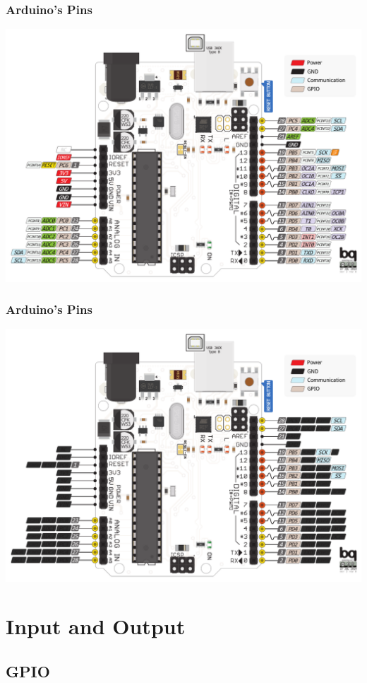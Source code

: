 \documentclass{beamer}
\begin{document}
\begin{frame}
  \frametitle{Arduino's Pins}
  \centering
  \includegraphics[width=.8\textwidth]{images/uno.pdf}
\end{frame}

\begin{frame}
  \frametitle{Arduino's Pins}
  \centering
  \includegraphics[width=.8\textwidth]{images/uno-focus.pdf}
\end{frame}

\section{Input and Output}
\subsection{GPIO}
\end{document}
